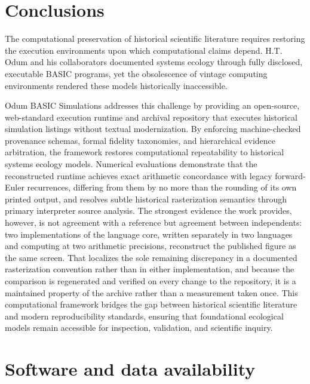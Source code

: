 \documentclass[11pt,a4paper]{article}
\begin{document}
\section{Conclusions}
\label{sec:conclusions}

The computational preservation of historical scientific literature requires restoring the execution environments upon which computational claims depend. H.T. Odum and his collaborators documented systems ecology through fully disclosed, executable BASIC programs, yet the obsolescence of vintage computing environments rendered these models historically inaccessible.

Odum BASIC Simulations addresses this challenge by providing an open-source, web-standard execution runtime and archival repository that executes historical simulation listings without textual modernization. By enforcing machine-checked provenance schemas, formal fidelity taxonomies, and hierarchical evidence arbitration, the framework restores computational repeatability to historical systems ecology models. Numerical evaluations demonstrate that the reconstructed runtime achieves exact arithmetic concordance with legacy forward-Euler recurrences, differing from them by no more than the rounding of its own printed output, and resolves subtle historical rasterization semantics through primary interpreter source analysis. The strongest evidence the work provides, however, is not agreement with a reference but agreement between independents: two implementations of the language core, written separately in two languages and computing at two arithmetic precisions, reconstruct the published figure as the same screen. That localizes the sole remaining discrepancy in a documented rasterization convention rather than in either implementation, and because the comparison is regenerated and verified on every change to the repository, it is a maintained property of the archive rather than a measurement taken once. This computational framework bridges the gap between historical scientific literature and modern reproducibility standards, ensuring that foundational ecological models remain accessible for inspection, validation, and scientific inquiry.

\section*{Software and data availability}
\end{document}
